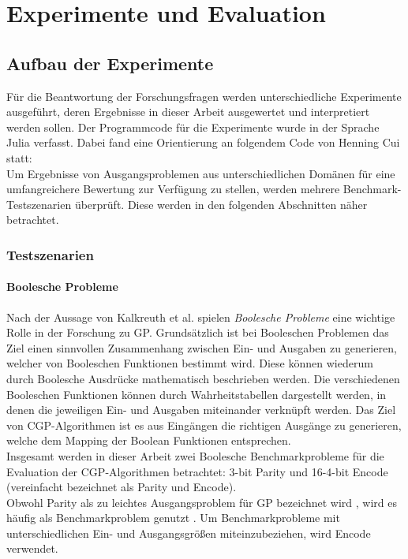 \chapter{Experimente und Evaluation}
\label{praktischer Teil}

\section{Aufbau der Experimente}
\label{sec:aufbauExperimente}

Für die Beantwortung der Forschungsfragen werden unterschiedliche Experimente ausgeführt, deren Ergebnisse in dieser Arbeit ausgewertet und interpretiert werden sollen.
Der Programmcode für die Experimente wurde in der Sprache Julia verfasst.
Dabei fand eine Orientierung an folgendem Code von Henning Cui statt: \cite{cuihen_cuihencgp_with_crossover_strategies_2024}\\
Um Ergebnisse von Ausgangsproblemen aus unterschiedlichen Domänen für eine umfangreichere Bewertung zur Verfügung zu stellen, werden mehrere Benchmark-Testszenarien überprüft.
Diese werden in den folgenden Abschnitten näher betrachtet.

\subsection{Testszenarien}
\label{subsec:testszenarien}

\subsubsection{Boolesche Probleme}
\label{subsubsec:booleanProblems}

Nach der Aussage von Kalkreuth et al. spielen \emph{Boolesche Probleme} eine wichtige Rolle in der Forschung zu GP.
Grundsätzlich ist bei Booleschen Problemen das Ziel einen sinnvollen Zusammenhang zwischen Ein- und Ausgaben zu generieren, welcher von Booleschen Funktionen bestimmt wird.
Diese können wiederum durch Boolesche Ausdrücke mathematisch beschrieben werden.
Die verschiedenen Booleschen Funktionen können durch Wahrheitstabellen dargestellt werden, in denen die jeweiligen Ein- und Ausgaben miteinander verknüpft werden. \cite{kalkreuth_towards_2023}
Das Ziel von CGP-Algorithmen ist es aus Eingängen die richtigen Ausgänge zu generieren, welche dem Mapping der Boolean Funktionen entsprechen.\\

Insgesamt werden in dieser Arbeit zwei Boolesche Benchmarkprobleme für die Evaluation der CGP-Algorithmen betrachtet: 3-bit Parity und 16-4-bit Encode (vereinfacht bezeichnet als Parity und Encode).\\
Obwohl Parity als zu leichtes Ausgangsproblem für GP bezeichnet wird \cite{white_better_2013}, wird es häufig als Benchmarkproblem genutzt \cite{yu_neutrality_2001, kaufmann_kalkreuth_2017, kaufmann_kalkreuth_2020}.
Um Benchmarkprobleme mit unterschiedlichen Ein- und Ausgangsgrößen miteinzubeziehen, wird Encode verwendet.\\

